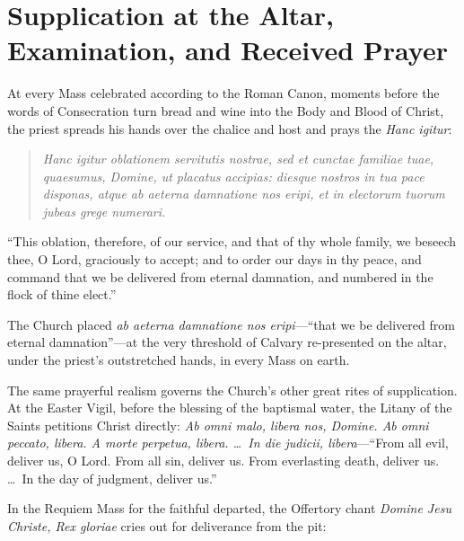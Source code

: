 \section{Supplication at the Altar, Examination, and Received Prayer}

At every Mass celebrated according to the Roman Canon, moments before the words of Consecration turn bread and wine into the Body and Blood of Christ, the priest spreads his hands over the chalice and host and prays the \textit{Hanc igitur}:

\begin{quote}
\textit{Hanc igitur oblationem servitutis nostrae, sed et cunctae familiae tuae, quaesumus, Domine, ut placatus accipias: diesque nostros in tua pace disponas, atque ab aeterna damnatione nos eripi, et in electorum tuorum jubeas grege numerari.}
\end{quote}

``This oblation, therefore, of our service, and that of thy whole family, we beseech thee, O Lord, graciously to accept; and to order our days in thy peace, and command that we be delivered from eternal damnation, and numbered in the flock of thine elect.''

The Church placed \textit{ab aeterna damnatione nos eripi}---``that we be delivered from eternal damnation''---at the very threshold of Calvary re-presented on the altar, under the priest's outstretched hands, in every Mass on earth.

The same prayerful realism governs the Church's other great rites of supplication. At the Easter Vigil, before the blessing of the baptismal water, the Litany of the Saints petitions Christ directly: \textit{Ab omni malo, libera nos, Domine. Ab omni peccato, libera. A morte perpetua, libera. \dots\ In die judicii, libera}---``From all evil, deliver us, O Lord. From all sin, deliver us. From everlasting death, deliver us. \dots\ In the day of judgment, deliver us.''

In the Requiem Mass for the faithful departed, the Offertory chant \textit{Domine Jesu Christe, Rex gloriae} cries out for deliverance from the pit:

